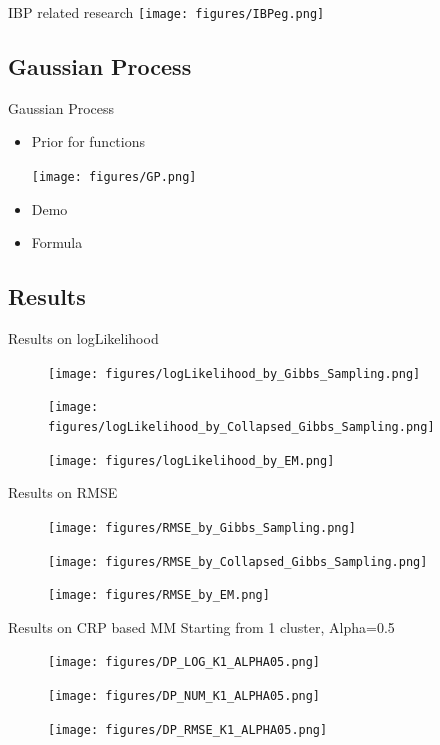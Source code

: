 \documentclass[handout]{beamer}
\begin{document}
\begin{frame}{IBP related research}
\texttt{[image: figures/IBPeg.png]}
\end{frame}

\subsection[GP]{Gaussian Process}
\begin{frame}{Gaussian Process}
\begin{itemize}
\item{Prior for functions}

\texttt{[image: figures/GP.png]}
\item{Demo}
\item{Formula}
\end{itemize}
\end{frame}

\subsection[Results]{Results}
\begin{frame}{Results on logLikelihood}
\begin{figure}[H]
\texttt{[image: figures/logLikelihood\_by\_Gibbs\_Sampling.png]}

\texttt{[image: figures/logLikelihood\_by\_Collapsed\_Gibbs\_Sampling.png]}

\texttt{[image: figures/logLikelihood\_by\_EM.png]}
\end{figure}
\end{frame}

\begin{frame}{Results on RMSE}
\begin{figure}[H]
\texttt{[image: figures/RMSE\_by\_Gibbs\_Sampling.png]}

\texttt{[image: figures/RMSE\_by\_Collapsed\_Gibbs\_Sampling.png]}

\texttt{[image: figures/RMSE\_by\_EM.png]}
\end{figure}
\end{frame}

\begin{frame}{Results on CRP based MM}
Starting from 1 cluster, Alpha=0.5

\begin{figure}[H]
\texttt{[image: figures/DP\_LOG\_K1\_ALPHA05.png]}

\texttt{[image: figures/DP\_NUM\_K1\_ALPHA05.png]}

\texttt{[image: figures/DP\_RMSE\_K1\_ALPHA05.png]}
\end{figure}
\end{frame}
\end{document}

